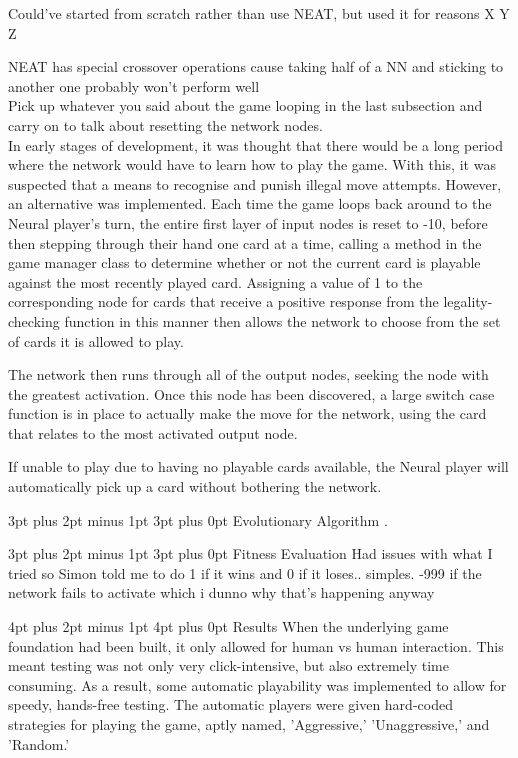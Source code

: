 \documentclass[12pt,a4paper]{article}
\makeatletter
\renewcommand\subsection{\@startsection {subsection}{1}{2mm} %
                               {3pt plus 2pt minus 1pt} %
                               {3pt plus 0pt} %
                               {\normalfont\bfseries}}
\renewcommand\section{\@startsection {section}{1}{0mm} %
                               {4pt plus 2pt minus 1pt} %
                               {4pt plus 0pt} %
                               {\bfseries}}
\makeatother
\begin{document}
Could've started from scratch rather than use NEAT, but used it for reasons X Y Z

NEAT has special crossover operations cause taking half of a NN and sticking to another one probably won't perform well \\


Pick up whatever you said about the game looping in the last subsection and carry on to talk about resetting the network nodes.\\

In early stages of development, it was thought that there would be a long period where the network would have to learn how to play the game. With this, it was suspected that a means to recognise and punish illegal move attempts. However, an alternative was implemented. Each time the game loops back around to the Neural player's turn, the entire first layer of input nodes is reset to -10, before then stepping through their hand one card at a time, calling a method in the game manager class to determine whether or not the current card is playable against the most recently played card. Assigning a value of 1 to the corresponding node for cards that receive a positive response from the legality-checking function in this manner then allows the network to choose from the set of cards it is allowed to play.

The network then runs through all of the output nodes, seeking the node with the greatest activation. Once this node has been discovered, a large switch case function is in place to actually make the move for the network, using the card that relates to the most activated output node. 

If unable to play due to having no playable cards available, the Neural player will automatically pick up a card without bothering the network. 


\subsection{Evolutionary Algorithm}
.

\subsection{Fitness Evaluation}
Had issues with what I tried so Simon told me to do 1 if it wins and 0 if it loses.. simples. -999 if the network fails to activate which i dunno why that's happening anyway


\newpage
\section{Results}
When the underlying game foundation had been built, it only allowed for human vs human interaction. This meant testing was not only very click-intensive, but also extremely time consuming. As a result, some automatic playability was implemented to allow for speedy, hands-free testing. The automatic players were given hard-coded strategies for playing the game, aptly named, 'Aggressive,' 'Unaggressive,' and 'Random.' 
\end{document}
